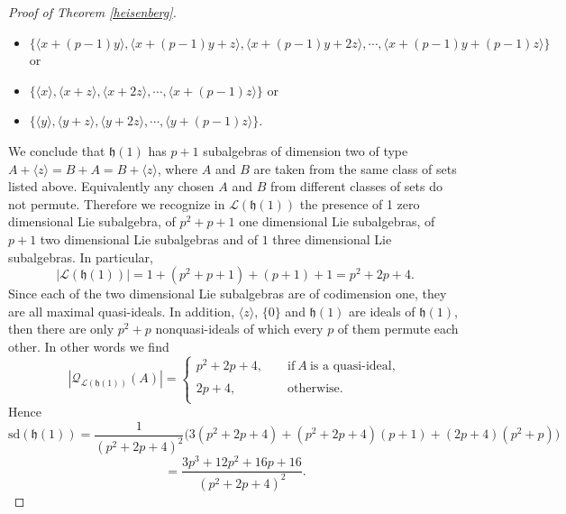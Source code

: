 \documentclass{amsart}
\newtheorem{corollary}[theorem]{Corollary}
\theoremstyle{definition}
\numberwithin{equation}{section}
\begin{document}
\begin{proof}[Proof of Theorem \ref{heisenberg}]
\begin{itemize}
    \item [$p-1$).]  $\{\langle  x+(p-1)y \rangle, \langle x+(p-1)y+z\rangle, \langle x+(p-1)y+2z\rangle, \cdots , \langle x+(p-1)y+(p-1)z\rangle \}$  or
    \item [$p$).] $\{\langle  x \rangle, \langle x+z\rangle, \langle x+2z\rangle, \cdots , \langle x+(p-1)z\rangle \}$ or 
    \item [$p+1$).] $\{\langle  y \rangle, \langle y+z\rangle, \langle y+2z\rangle, \cdots , \langle y+(p-1)z\rangle \}$.  
\end{itemize}
We conclude that $\mathfrak{h}(1)$ has $p+1$ subalgebras of dimension two of  type $A+\langle z \rangle= B+A=B+\langle z \rangle $, where $A$ and $B$ are taken from the same class of sets listed above. Equivalently any chosen $A$ and $B$ from different classes of sets do not permute. Therefore we recognize in  $\mathcal{L}(\mathfrak{h}(1))$ the presence of   1 zero dimensional Lie subalgebra, of $p^2+p+1$  one dimensional Lie subalgebras, of $p+1$ two dimensional Lie subalgebras and of $1$ three dimensional Lie subalgebras. In particular,  $$|\mathcal{L}(\mathfrak{h}(1))|=1+(p^2+p+1)+(p+1)+1= {p^2+2p+4}. $$ 
Since each  of the two dimensional Lie subalgebras are of codimension one,  they are all maximal quasi-ideals. In addition,  $\langle z \rangle $,  $\{0\}$ and $\mathfrak{h}(1)$ are ideals of $\mathfrak{h}(1)$, then there are only ${p^2+p}$ nonquasi-ideals of which every $p$ of them permute each other. In other words  we find
$$|\mathcal{Q}_{\mathcal{L}(\mathfrak{h}(1))}(A)|=\left\{\begin{array}{lcl} p^2+2p+4,&\,\,& \mathrm{if} \ A \ \mbox{is a quasi-ideal}, \\  
\\ 
 2p+4,&\,\,& \mathrm{otherwise} . \\
 \end{array}\right.$$
Hence  
 $$\mathrm{sd}(\mathfrak{h}(1))= \frac{1}{(p^2+2p+4)^2} \Big (3 (p^2+2p+4) + (p^2+2p+4)(p+1)+  (2p+4) (p^2+p)\Big) $$ $$ =\frac{3p^3+12p^2+16p+16}{{(p^2+2p+4)^2}} . $$
\end{proof}


\end{document}
